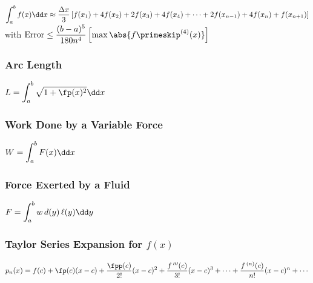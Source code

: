 \noindent$\ds\int_a^b{f(x)}\dd x \approx \frac{\Delta x}{3}\left[f(x_1)+4f(x_2) + 2f(x_3) + 4f(x_4) + \dotsb + 2f(x_{n-1}) + 4f(x_{n}) + f(x_{n+1})\right] 
$\smallskip\\
with $\text{Error} \leq \dfrac{(b-a)^5}{180n^4}\left[ \max \abs{f\primeskip^{(4)}(x)}\right]$

\vfill

\subsubsection*{Arc Length}

\noindent
$\ds L = \int_a^b{\sqrt{1+ \fp(x)^2}}\dd x$

\vfill


\noindent
\begin{minipage}[t]{.5\linewidth}
  \subsubsection*{Work Done by a Variable Force}
  $\ds W = \int_a^b{F(x)}\dd x$
\end{minipage}%
\begin{minipage}[t]{.5\linewidth}
 \subsubsection*{Force Exerted by a Fluid}
 $\ds F = \int_a^b{w\,d(y)\,\ell(y)}\dd y$
\end{minipage}

\vfill

\subsubsection*{Taylor Series Expansion for $f(x)$}
\noindent$\ds p_n(x) = f(c) + \fp(c)(x-c) + \frac{\fpp(c)}{2!}(x-c)^2 + \frac{f\,'''(c)}{3!}(x-c)^3 + \dotsb + \frac{f\,^{(n)}(c)}{n!}(x-c)^n + \dotsb $

